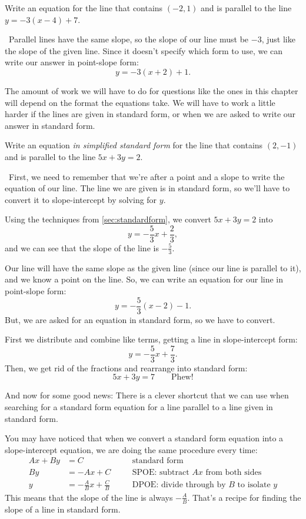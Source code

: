 \begin{boxedex}
Write an equation for the line that contains $(-2,1)$ and is parallel to the line $y=-3(x-4)+7$.

\exsoln\ Parallel lines have the same slope, so the slope of our line must be $-3$, just like the slope of the given line. Since it doesn't specify which form to use, we can write our answer in point-slope form: \[y=-3(x+2)+1.\]
\end{boxedex}

The amount of work we will have to do for questions like the ones in this chapter will depend on the format the equations take. We will have to work a little harder if the lines are given in standard form, or when we are asked to write our answer in standard form.

\begin{boxedex}
Write an equation \textit{in simplified standard form} for the line that contains $(2,-1)$ and is parallel to the line $5x+3y=2$.

\exsoln\ First, we need to remember that we're after a point and a slope to write the equation of our line. The line we are given is in standard form, so we'll have to convert it to slope-intercept by solving for $y$.

Using the techniques from \cref{sec:standardform}, we convert $5x + 3y = 2$ into \[y = -\frac{5}{3}x + \frac{2}{3},\] and we can see that the slope of the line is $-\frac{5}{3}$.

Our line will have the same slope as the given line (since our line is parallel to it), and we know a point on the line. So, we can write an equation for our line in point-slope form: \[y=-\frac{5}{3}(x-2)-1.\] But, we are asked for an equation in standard form, so we have to convert.

First we distribute and combine like terms, getting a line in slope-intercept form:\[y=-\frac{5}{3}x+\frac{7}{3}.\] Then, we get rid of the fractions and rearrange into standard form: \[5x + 3y = 7 \qquad\text{Phew!}\]
\end{boxedex}

And now for some good news: There is a clever shortcut that we can use when searching for a standard form equation for a line parallel to a line given in standard form. 

You may have noticed that when we convert a standard form equation into a slope-intercept equation, we are doing the same procedure every time:
\[\begin{aligned}
Ax + By &= C
&& \quad\text{standard form}
\\
By &= -Ax + C
&& \quad\text{SPOE: subtract $Ax$ from both sides}
\\
y &= -\frac{A}{B}x + \frac{C}{B}
&& \quad\text{DPOE: divide through by $B$ to isolate $y$}
\end{aligned}\]
This means that the slope of the line is always $-\frac{A}{B}$. That's a recipe for finding the slope of a line in standard form.

